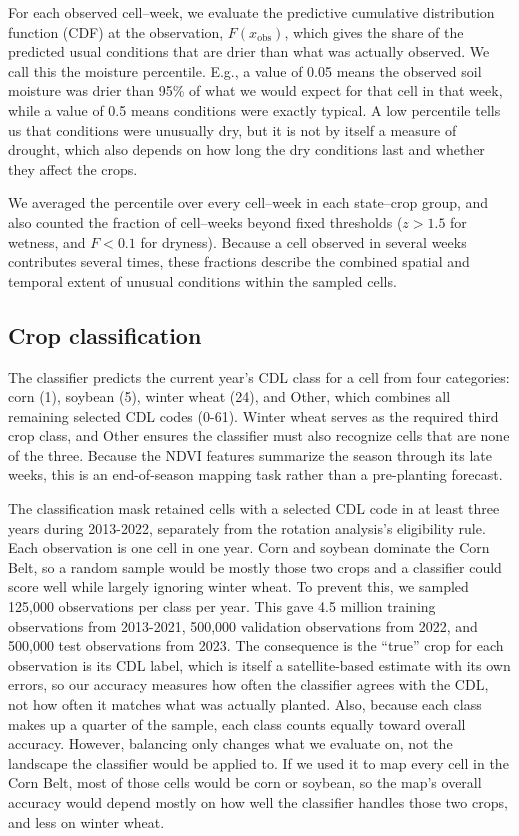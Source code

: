 \documentclass[10pt,letterpaper]{article}
\begin{document}
For each observed cell--week, we evaluate the predictive cumulative distribution function (CDF) at the observation, $F(x_{\mathrm{obs}})$, which gives the share of the predicted usual conditions that are drier than what was actually observed. We call this the moisture percentile. E.g., a value of 0.05 means the observed soil moisture was drier than 95\% of what we would expect for that cell in that week, while a value of 0.5 means conditions were exactly typical. A low percentile tells us that conditions were unusually dry, but it is not by itself a measure of drought, which also depends on how long the dry conditions last and whether they affect the crops.

We averaged the percentile over every cell--week in each state--crop group, and also counted the fraction of cell--weeks beyond fixed thresholds ($z>1.5$ for wetness, and $F<0.1$ for dryness). Because a cell observed in several weeks contributes several times, these fractions describe the combined spatial and temporal extent of unusual conditions within the sampled cells.

\subsection{Crop classification}\label{sec:method-classifier}

The classifier predicts the current year's CDL class for a cell from four categories: corn (1), soybean (5), winter wheat (24), and Other, which combines all remaining selected CDL codes (0-61). Winter wheat serves as the required third crop class, and Other ensures the classifier must also recognize cells that are none of the three. Because the NDVI features summarize the season through its late weeks, this is an end-of-season mapping task rather than a pre-planting forecast.

The classification mask retained cells with a selected CDL code in at least three years during 2013-2022, separately from the rotation analysis's eligibility rule. Each observation is one cell in one year. Corn and soybean dominate the Corn Belt, so a random sample would be mostly those two crops and a classifier could score well while largely ignoring winter wheat. To prevent this, we sampled 125,000 observations per class per year. This gave 4.5 million training observations from 2013-2021, 500,000 validation observations from 2022, and 500,000 test observations from 2023. The consequence is the ``true'' crop for each observation is its CDL label, which is itself a satellite-based estimate with its own errors, so our accuracy measures how often the classifier agrees with the CDL, not how often it matches what was actually planted. Also, because each class makes up a quarter of the sample, each class counts equally toward overall accuracy. However, balancing only changes what we evaluate on, not the landscape the classifier would be applied to. If we used it to map every cell in the Corn Belt, most of those cells would be corn or soybean, so the map's overall accuracy would depend mostly on how well the classifier handles those two crops, and less on winter wheat.
\end{document}

